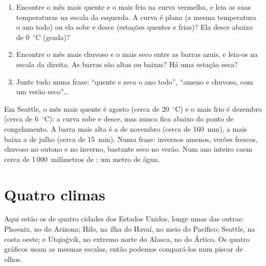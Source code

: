 \begin{method}\label{met:g5:weather-and-climate:reading}
\begin{enumerate}
  \item Encontre o mês mais quente e o mais frio na curva vermelha, e leia
        as suas temperaturas na escala da esquerda. A curva é plana (a
        mesma temperatura o ano todo) ou ela sobe e desce (estações quentes
        e frias)? Ela desce abaixo de 0~$^\circ$C (geada)?
  \item Encontre o mês mais chuvoso e o mais seco entre as barras azuis, e
        leia-os na escala da direita. As barras são altas ou baixas? Há uma
        estação seca?
  \item Junte tudo numa frase: ``quente e seco o ano todo'', ``ameno e
        chuvoso, com um verão seco''{\ldots}
\end{enumerate}
\end{method}

\begin{example}[Seattle]\label{ex:g5:weather-and-climate:seattle}
Em Seattle, o mês mais quente é agosto (cerca de 20~$^\circ$C) e o mais
frio é dezembro (cerca de 6~$^\circ$C): a curva sobe e desce, mas nunca
fica abaixo do ponto de congelamento. A barra mais alta é a de novembro
(cerca de 160~mm), a mais baixa a de julho (cerca de 15~mm). Numa frase:
invernos amenos, verões frescos, chuvoso no outono e no inverno, bastante
seco no verão. Num ano inteiro caem cerca de 1\,000~milímetros de :
um metro de água.
\end{example}

\section{Quatro climas}

Aqui estão os  de quatro cidades dos Estados Unidos, longe umas
das outras: Phoenix, no  do Arizona; Hilo, na ilha do Havaí, no meio
do  Pacífico; Seattle, na costa oeste; e Utqiaġvik, no extremo norte
do Alasca, no  do  Ártico. Os quatro gráficos usam as mesmas
escalas, então podemos compará-los num piscar de olhos.

